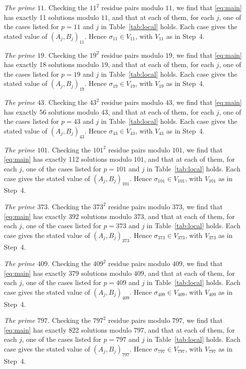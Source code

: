 \documentclass[11pt]{article}
\begin{document}
\emph{The prime $11$.} Checking the $11^2$ residue pairs modulo $11$, we find that \eqref{eq:main} has exactly 11 solutions modulo $11$, and that at each of them, for each $j$, one of the cases listed for $p=11$ and $j$ in Table~\ref{tab:local} holds. Each case gives the stated value of $(A_j,B_j)_{11}$. Hence $\sigma_{11}\in V_{11}$, with $V_{11}$ as in Step~4.

\emph{The prime $19$.} Checking the $19^2$ residue pairs modulo $19$, we find that \eqref{eq:main} has exactly 18 solutions modulo $19$, and that at each of them, for each $j$, one of the cases listed for $p=19$ and $j$ in Table~\ref{tab:local} holds. Each case gives the stated value of $(A_j,B_j)_{19}$. Hence $\sigma_{19}\in V_{19}$, with $V_{19}$ as in Step~4.

\emph{The prime $43$.} Checking the $43^2$ residue pairs modulo $43$, we find that \eqref{eq:main} has exactly 56 solutions modulo $43$, and that at each of them, for each $j$, one of the cases listed for $p=43$ and $j$ in Table~\ref{tab:local} holds. Each case gives the stated value of $(A_j,B_j)_{43}$. Hence $\sigma_{43}\in V_{43}$, with $V_{43}$ as in Step~4.

\emph{The prime $101$.} Checking the $101^2$ residue pairs modulo $101$, we find that \eqref{eq:main} has exactly 112 solutions modulo $101$, and that at each of them, for each $j$, one of the cases listed for $p=101$ and $j$ in Table~\ref{tab:local} holds. Each case gives the stated value of $(A_j,B_j)_{101}$. Hence $\sigma_{101}\in V_{101}$, with $V_{101}$ as in Step~4.

\emph{The prime $373$.} Checking the $373^2$ residue pairs modulo $373$, we find that \eqref{eq:main} has exactly 392 solutions modulo $373$, and that at each of them, for each $j$, one of the cases listed for $p=373$ and $j$ in Table~\ref{tab:local} holds. Each case gives the stated value of $(A_j,B_j)_{373}$. Hence $\sigma_{373}\in V_{373}$, with $V_{373}$ as in Step~4.

\emph{The prime $409$.} Checking the $409^2$ residue pairs modulo $409$, we find that \eqref{eq:main} has exactly 379 solutions modulo $409$, and that at each of them, for each $j$, one of the cases listed for $p=409$ and $j$ in Table~\ref{tab:local} holds. Each case gives the stated value of $(A_j,B_j)_{409}$. Hence $\sigma_{409}\in V_{409}$, with $V_{409}$ as in Step~4.

\emph{The prime $797$.} Checking the $797^2$ residue pairs modulo $797$, we find that \eqref{eq:main} has exactly 822 solutions modulo $797$, and that at each of them, for each $j$, one of the cases listed for $p=797$ and $j$ in Table~\ref{tab:local} holds. Each case gives the stated value of $(A_j,B_j)_{797}$. Hence $\sigma_{797}\in V_{797}$, with $V_{797}$ as in Step~4.
\end{document}
